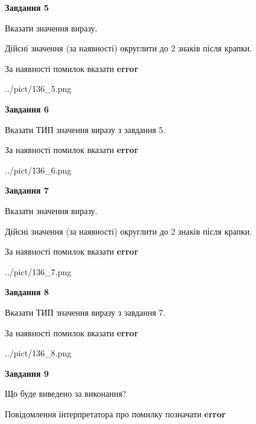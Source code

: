\documentclass[11pt, ukrainian]{article}
\begin{document}
{\begin {large}
{\begin {center}\textbf{Завдання 5}\end {center}}\par
Вказати значення виразу. \par
Дійсні значення (за наявності) округлити до 2 знаків після крапки. \par
За наявності помилок вказати \textbf{error}

\begin{center}
	{../pict/136_5.png}
\end{center}
\newpage

{\begin {center}\textbf{Завдання 6}\end {center}}\par
Вказати ТИП значення виразу з завдання 5. \par
За наявності помилок вказати \textbf{error}

\begin{center}
	{../pict/136_6.png}
\end{center}
\newpage

{\begin {center}\textbf{Завдання 7}\end {center}}\par
Вказати значення виразу. \par
Дійсні значення (за наявності) округлити до 2 знаків після крапки. \par
За наявності помилок вказати \textbf{error}

\begin{center}
	{../pict/136_7.png}
\end{center}
\newpage

{\begin {center}\textbf{Завдання 8}\end {center}}\par
Вказати ТИП значення виразу з завдання 7. \par
За наявності помилок вказати \textbf{error}

\begin{center}
	{../pict/136_8.png}
\end{center}
\newpage

{\begin {center}\textbf{Завдання 9}\end {center}}\par
Що буде виведено за виконання? \par
Повідомлення інтерпретатора про помилку позначати \textbf{error}


\end{large}}
\end{document}
